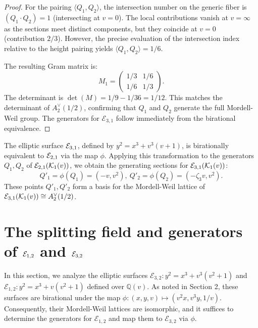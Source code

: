 \documentclass[11pt]{amsart}
\begin{document}
\begin{proof}
	For the pairing $\langle Q_1, Q_2 \rangle$, the intersection number on the generic fiber is $(Q_1 \cdot Q_2) = 1$ (intersecting at $v=0$). The local contributions vanish at $v=\infty$ as the sections meet distinct components, but they coincide at $v=0$ (contribution $2/3$). However, the precise evaluation of the intersection index relative to the height pairing yields $\langle Q_1, Q_2 \rangle = 1/6$.
	
	The resulting Gram matrix is:
	\begin{equation*}
		M_1 = \begin{pmatrix}
			1/3 & 1/6 \\ 
			1/6 & 1/3 
		\end{pmatrix}.
	\end{equation*}
	The determinant is $\det(M) = 1/9 - 1/36 = 1/12$. This matches the determinant of $A_2^\vee(1/2)$, confirming that $Q_1$ and $Q_2$ generate the full Mordell-Weil group. The generators for $\mathcal{E}_{3,1}$ follow immediately from the birational equivalence.
\end{proof}

\begin{cor}
	The elliptic surface ${\mathcal E}_{3,1}$, defined by $y^2 = x^3 + v^3(v+1)$, is birationally equivalent to ${\mathcal E}_{2,1}$ via the map $\phi$. Applying this transformation to the generators $Q_1, Q_2$ of ${\mathcal E}_{2,1}(\mathcal{K}_1(v))$, we obtain the generating sections for ${\mathcal E}_{3,1}(\mathcal{K}_1(v))$:
	\begin{equation}
		\label{P(3,1)}
		Q'_1  = \phi(Q_1) =   (-v, v^2), \
		Q'_2  = \phi(Q_2) =  (-\zeta_3 v, v^2).
	\end{equation}
	These points $Q'_1, Q'_2$ form a basis for the Mordell-Weil lattice of ${\mathcal E}_{3,1} (\mathcal{K}_{1}(v))\cong A_2^\vee(1/2)$.
\end{cor}



\section{The splitting field and generators of  ${\mathcal E}_{1,2}$ and ${\mathcal E}_{3,2}$}
\label{D4-(1,2)}


In this section, we analyze the elliptic surfaces $\mathcal{E}_{3,2}: y^2 = x^3 + v^3(v^2+1)$ and $\mathcal{E}_{1,2}: y^2 = x^3 + v(v^2+1)$ defined over $\mathbb{Q}(v)$. As noted in Section 2, these surfaces are birational under the map $\phi: (x, y, v) \mapsto (v^2 x , v^3 y , 1/v)$.  Consequently, their Mordell-Weil lattices are isomorphic, and it suffices to determine the generators for $\mathcal{E}_{1,2}$ and map them to $\mathcal{E}_{3,2}$ via $\phi$.
 
\end{document}
